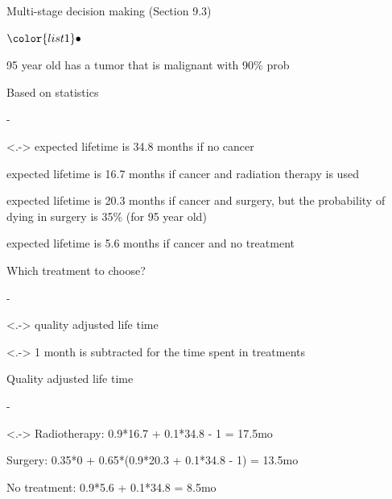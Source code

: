 \documentclass[t]{beamer}
\newenvironment{list1}{
   \begin{list}{$\color{list1}\bullet$}{\itemsep=6pt}}{
  \end{list}}
\newenvironment{list2}{
  \begin{list}{-}{\baselineskip=12pt\itemsep=2pt}}{
  \end{list}}
\begin{document}
\begin{frame}{Multi-stage decision making (Section 9.3)}

  \vspace{-0.3\baselineskip}
  \begin{list1}
  \item<+-> 95 year old has a tumor that is malignant with 90\% prob
  \item<+-> Based on statistics
    \begin{list2}
    \item<.-> expected lifetime is 34.8 months if no cancer
    \item<+-> expected lifetime is 16.7 months if cancer and radiation therapy is used
    \item<+-> expected lifetime is 20.3 months if cancer and surgery, but the probability of dying in surgery is 35\% (for 95 year old)
    \item<+-> expected lifetime is 5.6 months if cancer and no treatment
    \end{list2}
  \item<+-> Which treatment to choose?
    \begin{list2}
    \item<.-> quality adjusted life time
    \item<.-> 1 month is subtracted for the time spent in treatments
    \end{list2}
   \item<+-> Quality adjusted life time
    \begin{list2}
    \item<.-> Radiotherapy: 0.9*16.7 + 0.1*34.8 - 1 = 17.5mo
   \item<+-> Surgery: 0.35*0 + 0.65*(0.9*20.3 + 0.1*34.8 - 1) = 13.5mo
    \item<+-> No treatment: 0.9*5.6 + 0.1*34.8 = 8.5mo
    \end{list2}
\end{list1}

\end{frame}
\end{document}
